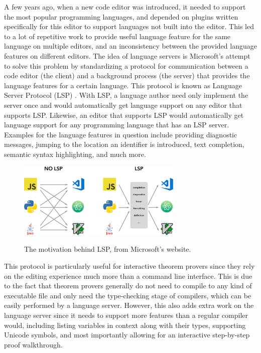 A few years ago, when a new code editor was introduced,
it needed to support the most popular programming languages,
and depended on plugins written specifically for this editor to support languages not built into the editor.
This led to a lot of repetitive work to provide useful language feature for the same language on multiple editors,
and an inconsistency between the provided language features on different editors.
The idea of language servers is Microsoft's attempt to solve this problem by standardizing a protocol for communication between a code editor (the client) and a background process (the server) that provides the language features for a certain language. This protocol is known as Language Server Protocol (LSP) \cite{Gunasinghe2022}. With LSP, a language author need only implement the server once and would automatically get language support on any editor that supports LSP. Likewise, an editor that supports LSP would automatically get language support for any programming language that has an LSP server. Examples for the language features in question include providing diagnostic messages, jumping to the location an identifier is introduced, text completion, semantic syntax highlighting, and much more.

\begin{figure}
  \centering
  \includegraphics[width=0.7\textwidth]{figs/LSP-MxN.png}
  \label{figure:lsp}
  \caption{
    The motivation behind LSP, from Microsoft's website.
    \protect\footnotemark
  }
\end{figure}

This protocol is particularly useful for interactive theorem provers since
they rely on the editing experience much more than a command line interface.
This is due to the fact that theorem provers generally do not need to compile
to any kind of executable file and only need the type-checking stage of compilers,
which can be easily performed by a language server. However, this also adds extra work
on the language server since it needs to support more features than a regular compiler would,
including listing variables in context along with their types, supporting Unicode symbols,
and most importantly allowing for an interactive step-by-step proof walkthrough.

